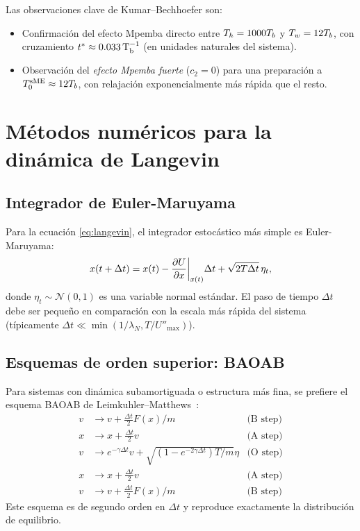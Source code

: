 \noindent Las observaciones clave de Kumar--Bechhoefer son:
\begin{itemize}
\item Confirmación del efecto Mpemba directo entre $T_{h} = 1000 T_{b}$ y $T_{w} = 12 T_{b}$, 
con cruzamiento $t^{\ast} \approx \SI{0.033}{T_{b}^{-1}}$ (en unidades naturales 
del sistema).
\item Observación del \emph{efecto Mpemba fuerte} ($c_{2} = 0$) para una 
preparación a $T_{0}^{\mathrm{sME}} \approx 12 T_{b}$, con relajación 
exponencialmente más rápida que el resto.
\end{itemize}

\section{Métodos numéricos para la dinámica de Langevin}

\subsection{Integrador de Euler-Maruyama}

Para la ecuación \cref{eq:langevin}, el integrador estocástico más simple es 
Euler-Maruyama:
\begin{equation}
    x(t + \Delta t) = x(t) - \pdv{U}{x}\bigg|_{x(t)} \Delta t + \sqrt{2 T \Delta t} \, \eta_t,
    \label{eq:euler_maruyama}
\end{equation}
%
donde $\eta_t \sim \mathcal{N}(0, 1)$ es una variable normal estándar. El paso 
de tiempo $\Delta t$ debe ser pequeño en comparación con la escala más rápida 
del sistema (típicamente $\Delta t \ll \min(1/\lambda_N, T/U''_{\max})$).

\subsection{Esquemas de orden superior: BAOAB}

Para sistemas con dinámica subamortiguada o estructura más fina, se prefiere el 
esquema BAOAB de Leimkuhler--Matthews~\cite{leimkuhler2013}:
%
\begin{align}
    v &\to v + \tfrac{\Delta t}{2} F(x) / m & \text{(B step)} \\
    x &\to x + \tfrac{\Delta t}{2} v & \text{(A step)} \\
    v &\to e^{-\gamma \Delta t} v + \sqrt{(1-e^{-2\gamma \Delta t}) T / m} \eta & \text{(O step)} \\
    x &\to x + \tfrac{\Delta t}{2} v & \text{(A step)} \\
    v &\to v + \tfrac{\Delta t}{2} F(x) / m & \text{(B step)}
\end{align}
%
Este esquema es de segundo orden en $\Delta t$ y reproduce exactamente la 
distribución de equilibrio.

